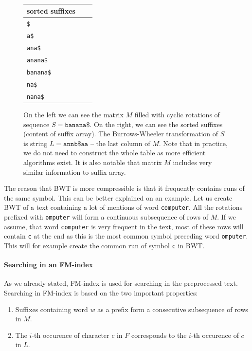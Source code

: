 \begin{figure}
{	\begin{tabular}{l l l}
		sorted suffixes\\
	\hline
		\tt \$ \\
		\tt a\$ \\
		\tt ana\$ \\
		\tt anana\$ \\
		\tt banana\$ \\
		\tt na\$ \\
		\tt nana\$ \\
	\end{tabular}
	}
	\caption[TODO]{On the left we can see the matrix $M$ filled with cyclic rotations of sequence
	$S = \mathtt{banana\$}$. On the right, we can see the sorted suffixes (content of suffix array). The
	Burrows-Wheeler transformation of $S$ is string $L=\mathtt{annb\$aa}$ -- the last column of $M$.
	Note that in practice, we do not need to construct the whole table as more efficient algorithms exist.
	It is also notable that matrix $M$ includes very similar information to suffix array.
	}
	\label{obr:BWT}
\end{figure}

The reason that BWT is more compressible is that it frequently contains runs of the same
symbol. This can be better explained on an example. Let us create BWT of a text containing
a lot of mentions of word {\tt computer}. All the rotations prefixed with {\tt omputer} will form a
continuous subsequence of rows of $M$. If we assume, that word {\tt computer} is very frequent
in the text, most of these rows will contain {\tt c} at the end as this is the most common symbol
preceding word {\tt omputer}. This will for example create the common run of symbol {\tt c} in BWT.

\paragraph{Searching in an FM-index}

As we already stated, FM-index is used for searching in the preprocessed text.
Searching in FM-index is based on the two important properties:

\begin{enumerate}
	\item Suffixes containing word $w$ as a prefix form a consecutive subsequence of rows in $M$.
	\label{chapter1:fmindexprop:prop1}
	\item The $i$-th occurence of character $c$ in $F$ corresponds to the $i$-th occurence of $c$ in $L$.
	\label{chapter1:fmindexprop:prop2}
\end{enumerate}

